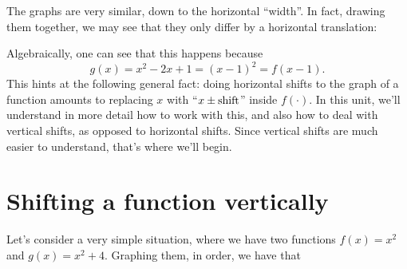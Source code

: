 \documentclass{ximera}
\begin{document}
The graphs are very similar, down to the horizontal ``width''. In fact, drawing them together, we may see that they only differ by a horizontal translation:

  \begin{image}
 \end{image}

Algebraically, one can see that this happens because $$g(x) = x^2-2x+1 = (x-1)^2 = f(x-1).$$
This hints at the following general fact: doing horizontal shifts to the graph of a function amounts to replacing $x$ with ``$x \pm {\rm shift}$'' inside $f(\cdot)$. In this unit, we'll understand in more detail how to work with this, and also how to deal with vertical shifts, as opposed to horizontal shifts. Since vertical shifts are much easier to understand, that's where we'll begin.

\section{Shifting a function vertically}

Let's consider a very simple situation, where we have two functions $f(x) = x^2$ and $g(x) = x^2+4$. Graphing them, in order, we have that

  \begin{image}
\end{image}
  \begin{image}
 \end{image}
\end{document}
